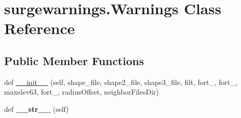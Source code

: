 \hypertarget{classsurgewarnings_1_1_warnings}{}\section{surgewarnings.\+Warnings Class Reference}
\label{classsurgewarnings_1_1_warnings}
\subsection*{Public Member Functions}
\begin{DoxyCompactItemize}
\item 
def \hyperlink{classsurgewarnings_1_1_warnings_a1923795bb18f52944d6e6451bdd35b99}{\+\_\+\+\_\+init\+\_\+\+\_\+} (self, shape\+\_\+file, shape2\+\_\+file, shape3\+\_\+file, filt, fort\+\_, fort\+\_, maxelev63, fort\+\_, radius\+Offset, neighbor\+Files\+Dir)
\item 
\hypertarget{classsurgewarnings_1_1_warnings_ac8b7ce9f91ca6901b464cc4356f77648}{}def {\bfseries \+\_\+\+\_\+str\+\_\+\+\_\+} (self)\label{classsurgewarnings_1_1_warnings_ac8b7ce9f91ca6901b464cc4356f77648}


\end{DoxyCompactItemize}
